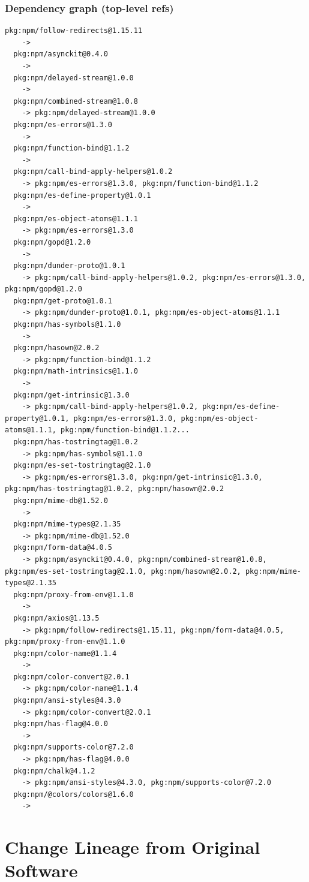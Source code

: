 \documentclass[11pt,a4paper]{article}
\begin{document}
\subsubsection*{Dependency graph (top-level refs)}
\begin{lstlisting}[style=depgraph]
  pkg:npm/follow-redirects@1.15.11
    -> 
  pkg:npm/asynckit@0.4.0
    -> 
  pkg:npm/delayed-stream@1.0.0
    -> 
  pkg:npm/combined-stream@1.0.8
    -> pkg:npm/delayed-stream@1.0.0
  pkg:npm/es-errors@1.3.0
    -> 
  pkg:npm/function-bind@1.1.2
    -> 
  pkg:npm/call-bind-apply-helpers@1.0.2
    -> pkg:npm/es-errors@1.3.0, pkg:npm/function-bind@1.1.2
  pkg:npm/es-define-property@1.0.1
    -> 
  pkg:npm/es-object-atoms@1.1.1
    -> pkg:npm/es-errors@1.3.0
  pkg:npm/gopd@1.2.0
    -> 
  pkg:npm/dunder-proto@1.0.1
    -> pkg:npm/call-bind-apply-helpers@1.0.2, pkg:npm/es-errors@1.3.0, pkg:npm/gopd@1.2.0
  pkg:npm/get-proto@1.0.1
    -> pkg:npm/dunder-proto@1.0.1, pkg:npm/es-object-atoms@1.1.1
  pkg:npm/has-symbols@1.1.0
    -> 
  pkg:npm/hasown@2.0.2
    -> pkg:npm/function-bind@1.1.2
  pkg:npm/math-intrinsics@1.1.0
    -> 
  pkg:npm/get-intrinsic@1.3.0
    -> pkg:npm/call-bind-apply-helpers@1.0.2, pkg:npm/es-define-property@1.0.1, pkg:npm/es-errors@1.3.0, pkg:npm/es-object-atoms@1.1.1, pkg:npm/function-bind@1.1.2...
  pkg:npm/has-tostringtag@1.0.2
    -> pkg:npm/has-symbols@1.1.0
  pkg:npm/es-set-tostringtag@2.1.0
    -> pkg:npm/es-errors@1.3.0, pkg:npm/get-intrinsic@1.3.0, pkg:npm/has-tostringtag@1.0.2, pkg:npm/hasown@2.0.2
  pkg:npm/mime-db@1.52.0
    -> 
  pkg:npm/mime-types@2.1.35
    -> pkg:npm/mime-db@1.52.0
  pkg:npm/form-data@4.0.5
    -> pkg:npm/asynckit@0.4.0, pkg:npm/combined-stream@1.0.8, pkg:npm/es-set-tostringtag@2.1.0, pkg:npm/hasown@2.0.2, pkg:npm/mime-types@2.1.35
  pkg:npm/proxy-from-env@1.1.0
    -> 
  pkg:npm/axios@1.13.5
    -> pkg:npm/follow-redirects@1.15.11, pkg:npm/form-data@4.0.5, pkg:npm/proxy-from-env@1.1.0
  pkg:npm/color-name@1.1.4
    -> 
  pkg:npm/color-convert@2.0.1
    -> pkg:npm/color-name@1.1.4
  pkg:npm/ansi-styles@4.3.0
    -> pkg:npm/color-convert@2.0.1
  pkg:npm/has-flag@4.0.0
    -> 
  pkg:npm/supports-color@7.2.0
    -> pkg:npm/has-flag@4.0.0
  pkg:npm/chalk@4.1.2
    -> pkg:npm/ansi-styles@4.3.0, pkg:npm/supports-color@7.2.0
  pkg:npm/@colors/colors@1.6.0
    -> 
\end{lstlisting}

\newpage
\section{Change Lineage from Original Software}
\end{document}
